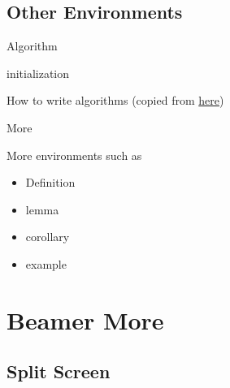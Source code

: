     \subsection{Other Environments}

    \begin{frame}[shrink=15]{Algorithm}
        
        \begin{algorithm}[H]
            initialization\;
            \caption{How to write algorithms
            (copied from \href{https://en.wikibooks.org/wiki/LaTeX/Algorithms}{here})}
            \end{algorithm}
    \end{frame}

    \begin{frame}{More}

        More environments such as

        \begin{itemize}
            \item Definition
            \item lemma
            \item corollary
            \item example
        \end{itemize}
        
    \end{frame}

    \section{Beamer More}

    \subsection{Split Screen}
    
